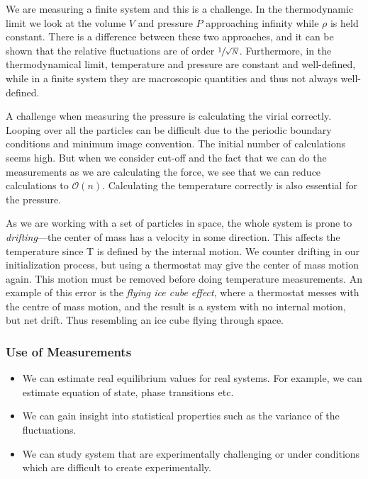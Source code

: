 \documentclass[11pt]{article}
\numberwithin{equation}{section}
\numberwithin{figure}{section}
\newcommand{\mc}[1]{\mathcal{#1}}
\newcommand{\ita}[1]{\textit{#1}}
\begin{document}
We are measuring a finite system and this is a challenge.
In the thermodynamic limit we look at the volume $V$ and
pressure $P$ approaching infinity while $\rho$ is held constant.
There is a difference between these two approaches,
and it can be shown that the relative fluctuations are
of order $\sfrac{1}{\sqrt{N}}$. Furthermore,
in the thermodynamical limit, temperature and pressure are constant
and well-defined, while in a finite system they are macroscopic
quantities and thus not always well-defined.

A challenge when measuring the pressure is
calculating the virial correctly.
Looping over all the particles can be difficult due
to the periodic boundary conditions and minimum image
convention. The initial number of calculations seems
high. But when we consider cut-off and
the fact that we can do the measurements as we are calculating
the force, we see that we can reduce calculations to $\mc O(n)$.
Calculating the temperature correctly is also essential for
the pressure.

As we are working with a set of particles in space,
the whole system is prone to \ita{drifting}---the
center of mass has a velocity in some direction.
This affects the temperature since T is defined
by the internal motion.
We counter drifting in our initialization process,
but using a thermostat may give the center of mass motion again.
This motion must be removed before doing temperature measurements.
An example of this error is the \ita{flying ice cube effect},
where a thermostat messes with the centre of mass motion,
and the result is a system with no internal motion, but net drift.
Thus resembling an ice cube flying through space.

\subsubsection{Use of Measurements}
\begin{itemize}
    \item We can estimate real equilibrium values for real systems.
        For example, we can estimate equation of state, phase transitions etc.
    \item We can gain insight into statistical properties such as
        the variance of the fluctuations.
    \item We can study system that are experimentally challenging
        or under conditions which are difficult to create experimentally.
\end{itemize}
\end{document}
